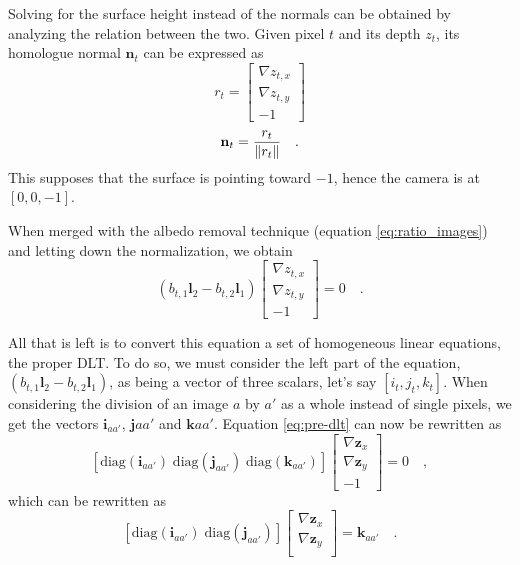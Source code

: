 \documentclass{report}
\begin{document}
Solving for the surface height instead of the normals can be obtained by analyzing the relation between the two. Given pixel $t$ and its depth $z_t$, its homologue normal $\mathbf{n}_t$ can be expressed as
\begin{equation}
r_t = 
\begin{bmatrix}
\nabla z_{t,x} \\
\nabla z_{t,y} \\
-1
\end{bmatrix}
\end{equation}
\begin{equation}
\mathbf{n}_t =
\frac{r_t}{\left\lVert r_t\right\rVert} \quad.
\end{equation}
This supposes that the surface is pointing toward $-1$, hence the camera is at $[0, 0, -1]$.

When merged with the albedo removal technique (equation \eqref{eq:ratio_images}) and letting down the normalization, we obtain
\begin{equation}
\label{eq:pre-dlt}
\left( b_{t,1} \mathbf{l}_2 - b_{t,2} \mathbf{l}_1 \right)
\begin{bmatrix}
\nabla z_{t,x} \\
\nabla z_{t,y} \\
-1
\end{bmatrix}
= 0  \quad.
\end{equation}

All that is left is to convert this equation a set of homogeneous linear equations, the proper DLT. To do so, we must consider the left part of the equation, $\left( b_{t,1} \mathbf{l}_2 - b_{t,2} \mathbf{l}_1 \right)$, as being a vector of three scalars, let's say $\left[ i_t, j_t, k_t \right]$. When considering the division of an image $a$ by $a'$ as a whole instead of single pixels, we get the vectors $\mathbf{i}_{aa'}$, $\mathbf{j}{aa'}$ and $\mathbf{k}{aa'}$. Equation \eqref{eq:pre-dlt} can now be rewritten as
\begin{equation}
\left[ \mathrm{diag}(\mathbf{i}_{aa'}) \; \mathrm{diag}(\mathbf{j}_{aa'}) \; \mathrm{diag}(\mathbf{k}_{aa'})\right]
\begin{bmatrix}
\nabla \mathbf{z}_{x} \\
\nabla \mathbf{z}_{y} \\
-1
\end{bmatrix}
= 0 \quad,
\end{equation}
which can be rewritten as
\begin{equation}
\left[ \mathrm{diag}(\mathbf{i}_{aa'}) \; \mathrm{diag}(\mathbf{j}_{aa'}) \right]
\begin{bmatrix}
\nabla \mathbf{z}_{x} \\
\nabla \mathbf{z}_{y} \\
\end{bmatrix}
= \mathbf{k}_{aa'} \quad.
\end{equation}
\end{document}
